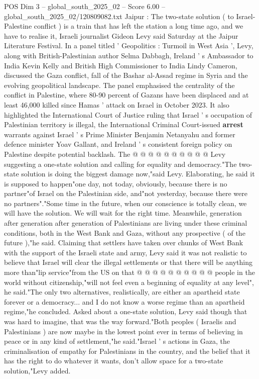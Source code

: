\begin{textsample}{POS Dim 3 – global\_south\_2025\_02 – Score 6.00 – global\_south\_2025\_02/120809082.txt}  \label{ex:f3_pos_443}
Jaipur : The two-state solution ( to Israel-Palestine conflict ) is a train that has left the station a long time ago, and we have to realise it, Israeli journalist Gideon Levy said Saturday at the Jaipur Literature Festival.
In a panel titled ' Geopolitics : Turmoil in West Asia ', Levy, along with British-Palestinian author Selma Dabbagh, Ireland ' s Ambassador to India Kevin Kelly and British High Commissioner to India Lindy Cameron, discussed the Gaza conflict, fall of the Bashar al-Assad regime in Syria and the evolving geopolitical landscape.
The panel emphasised the centrality of the conflict in Palestine, where 80-90 percent of Gazans have been displaced and at least 46,000 killed since Hamas ' attack on Israel in October 2023.
It also highlighted the International Court of Justice ruling that Israel ' s occupation of Palestinian territory is illegal, the International Criminal Court-issued \textbf{arrest} warrants against Israel ' s Prime Minister Benjamin Netanyahu and former defence minister Yoav Gallant, and Ireland ' s consistent foreign policy on Palestine despite potential backlash.
The @ @ @ @ @ @ @ @ @ @ Levy suggesting a one-state solution and calling for equality and democracy."The two-state solution is doing the biggest damage now,"said Levy.
Elaborating, he said it is supposed to happen"one day, not today, obviously, because there is no partner"of Israel on the Palestinian side, and"not yesterday, because there were no partners"."Some time in the future, when our conscience is totally clean, we will have the solution.
We will wait for the right time.
Meanwhile, generation after generation after generation of Palestinians are living under these criminal conditions, both in the West Bank and Gaza, without any prospective ( of the future ),"he said.
Claiming that settlers have taken over chunks of West Bank with the support of the Israeli state and army, Levy said it was not realistic to believe that Israel will clear the illegal settlements or that there will be anything more than"lip service"from the US on that @ @ @ @ @ @ @ @ @ @ people in the world without citizenship,"will not feel even a beginning of equality at any level", he said."The only two alternatives, realistically, are either an apartheid state forever or a democracy... and I do not know a worse regime than an apartheid regime,"he concluded.
Asked about a one-state solution, Levy said though that was hard to imagine, that was the way forward."Both peoples ( Israelis and Palestinians ) are now maybe in the lowest point ever in terms of believing in peace or in any kind of settlement,"he said."Israel ' s actions in Gaza, the criminalisation of empathy for Palestinians in the country, and the belief that it has the right to do whatever it wants, don't allow space for a two-state solution,"Levy added.

\end{textsample}
